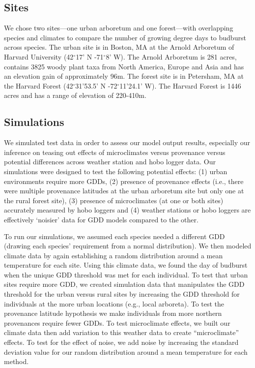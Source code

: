 \documentclass{article}\usepackage[]{graphicx}\usepackage[]{color}
\begin{document}
\subsection*{Sites}
We chose two sites---one urban arboretum and one forest---with overlapping species and climates to compare the number of growing degree days to budburst across species. The urban site is in Boston, MA at the Arnold Arboretum of Harvard University (42$^{\circ}$17' N -71$^{\circ}$8' W). The Arnold Arboretum is 281 acres, contains 3825 woody plant taxa from North America, Europe and Asia and has an elevation gain of approximately 96m. The forest site is in Petersham, MA at the Harvard Forest (42$^{\circ}$31'53.5' N -72$^{\circ}$11'24.1' W). The Harvard Forest is 1446 acres and has a range of elevation of 220-410m. 

\subsection*{Simulations}
We simulated test data in order to assess our model output results, especially our inference on teasing out effects of microclimates versus provenance versus potential differences across weather station and hobo logger data. Our simulations were designed to test the following potential effects: (1) urban environments require more GDDs, (2) presence of provenance effects (i.e., there were multiple provenance latitudes at the urban arboretum site but only one at the rural forest site), (3) presence of microclimates (at one or both sites) accurately measured by hobo loggers and (4) weather stations or hobo loggers are effectively `noisier' data for GDD models compared to the other. 

To run our simulations, we assumed each species needed a different GDD (drawing each species' requirement from a normal distribution). We then modeled climate data by again establishing a random distribution around a mean temperature for each site. Using this climate data, we found the day of budburst when the unique GDD threshold was met for each individual. To test that urban sites require more GDD, we created simulation data that manipulates the GDD threshold for the urban versus rural sites by increasing the GDD threshold for individuals at the more urban locations (e.g., local arboreta). To test the provenance latitude hypothesis we make individuals from more northern provenances require fewer GDDs. To test microclimate effects, we built our climate data then add variation to this weather data to create ``microclimate'' effects.  To test for the effect of noise, we add noise by increasing the standard deviation value for our random distribution around a mean temperature for each method.
\end{document}
